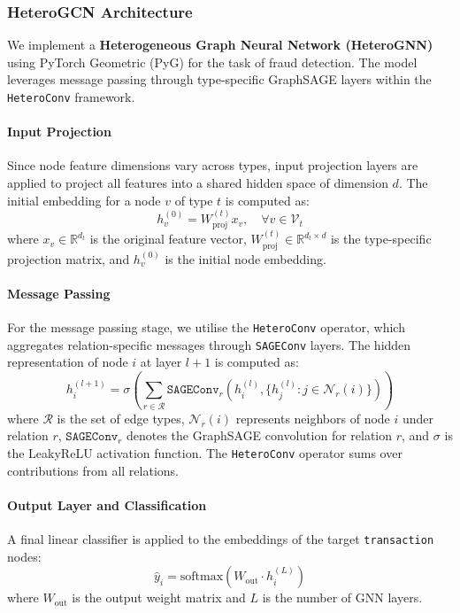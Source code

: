 \documentclass[conference]{IEEEtran}
\begin{document}
\subsubsection{HeteroGCN Architecture}

We implement a \textbf{Heterogeneous Graph Neural Network (HeteroGNN)} using PyTorch Geometric (PyG) for the task of fraud detection. The model leverages message passing through type-specific GraphSAGE layers within the \texttt{HeteroConv} framework.

\paragraph{Input Projection}
Since node feature dimensions vary across types, input projection layers are applied to project all features into a shared hidden space of dimension $d$. The initial embedding for a node $v$ of type $t$ is computed as:
\begin{equation}
    h_v^{(0)} = W_{\text{proj}}^{(t)} x_v, \quad \forall v \in \mathcal{V}_t
    \label{eq:input-projection}
\end{equation}
where $x_v \in \mathbb{R}^{d_t}$ is the original feature vector, $W_{\text{proj}}^{(t)} \in \mathbb{R}^{d_t \times d}$ is the type-specific projection matrix, and $h_v^{(0)}$ is the initial node embedding.

\paragraph{Message Passing}
For the message passing stage, we utilise the \texttt{HeteroConv} operator, which aggregates relation-specific messages through \texttt{SAGEConv} layers. The hidden representation of node $i$ at layer $l+1$ is computed as:
\begin{equation}
    h_i^{(l+1)} = \sigma \left( \sum_{r \in \mathcal{R}} \texttt{SAGEConv}_r(h_i^{(l)}, \{ h_j^{(l)} : j \in \mathcal{N}_r(i) \}) \right)
    \label{eq:message-passing}
\end{equation}
where $\mathcal{R}$ is the set of edge types, $\mathcal{N}_r(i)$ represents neighbors of node $i$ under relation $r$, $\texttt{SAGEConv}_r$ denotes the GraphSAGE convolution for relation $r$, and $\sigma$ is the LeakyReLU activation function. The \texttt{HeteroConv} operator sums over contributions from all relations.

\paragraph{Output Layer and Classification}
A final linear classifier is applied to the embeddings of the target \texttt{transaction} nodes:
\begin{equation}
    \hat{y}_i = \text{softmax}(W_{\text{out}} \cdot h_i^{(L)})
    \label{eq:output}
\end{equation}
where $W_{\text{out}}$ is the output weight matrix and $L$ is the number of GNN layers.
\end{document}
